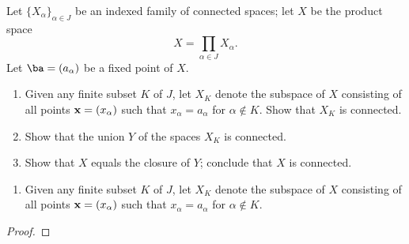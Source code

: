 \begin{exercise}[ID=3.23.10]
  Let $\{X_\alpha\}_{\alpha \in J}$ be an indexed family of connected spaces;
  let $X$ be the product space
  \begin{equation*}
    X = \prod_{\alpha \in J} X_\alpha.
  \end{equation*}
  Let $\ba = (a_\alpha)$ be a fixed point of $X$.
  \begin{enumerate}[label={(\alph*)}, align=left, leftmargin=\parindent, listparindent=\parindent, labelwidth=0pt, itemindent=!]
    \item
      Given any finite subset $K$ of $J$, let $X_K$ denote the subspace of $X$ consisting of all points $\mathbf{x} = (x_\alpha)$ such that $x_\alpha = a_\alpha$ for $\alpha \not\in K$.
      Show that $X_K$ is connected.
    \item
      Show that the union $Y$ of the spaces $X_K$ is connected.
    \item
      Show that $X$ equals the closure of $Y$;
      conclude that $X$ is connected.
  \end{enumerate}
\end{exercise}
%
\begin{solution}
  \begin{enumerate}[label={(\alph*)}, align=left, leftmargin=\parindent, listparindent=\parindent, labelwidth=0pt, itemindent=!]
    \item
      Given any finite subset $K$ of $J$, let $X_K$ denote the subspace of $X$ consisting of all points $\mathbf{x} = (x_\alpha)$ such that $x_\alpha = a_\alpha$ for $\alpha \not\in K$.
  \end{enumerate}
  \begin{proof}
  \end{proof}
\end{solution}
\newpage

